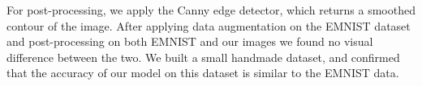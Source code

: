 \documentclass[11pt, a4paper]{report}
\begin{document}
For post-processing, we apply the Canny edge detector, which returns a smoothed contour of the image. After applying data augmentation on the EMNIST dataset and post-processing on both EMNIST and our images we found no visual difference between the two. We built a small handmade dataset, and confirmed that the accuracy of our model on this dataset is similar to the EMNIST data.
 


\begin{figure}[!h]
	\begin{center}
		\hspace{1cm}
		\\

\end{center}
\end{figure}
\end{document}
